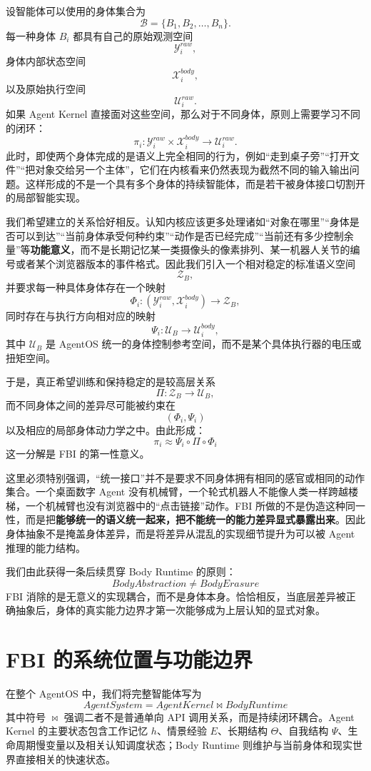 设智能体可以使用的身体集合为
\[
\mathcal B
=
\{B_1,B_2,\ldots,B_n\}.
\]
每一种身体 \(B_i\) 都具有自己的原始观测空间
\[
\mathcal Y_i^{raw},
\]
身体内部状态空间
\[
\mathcal X_i^{body},
\]
以及原始执行空间
\[
\mathcal U_i^{raw}.
\]
如果 Agent Kernel 直接面对这些空间，那么对于不同身体，原则上需要学习不同的闭环：
\[
\pi_i:
\mathcal Y_i^{raw}
\times
\mathcal X_i^{body}
\rightarrow
\mathcal U_i^{raw}.
\]
此时，即使两个身体完成的是语义上完全相同的行为，例如“走到桌子旁”“打开文件”“把对象交给另一个主体”，它们在内核看来仍然表现为截然不同的输入输出问题。这样形成的不是一个具有多个身体的持续智能体，而是若干被身体接口切割开的局部智能实现。

我们希望建立的关系恰好相反。认知内核应该更多处理诸如“对象在哪里”“身体是否可以到达”“当前身体承受何种约束”“动作是否已经完成”“当前还有多少控制余量”等\textbf{功能意义}，而不是长期记忆某一类摄像头的像素排列、某一机器人关节的编号或者某个浏览器版本的事件格式。因此我们引入一个相对稳定的标准语义空间
\[
\mathcal Z_B,
\]
并要求每一种具体身体存在一个映射
\[
\Phi_i:
(\mathcal Y_i^{raw},\mathcal X_i^{body})
\rightarrow
\mathcal Z_B,
\]
同时存在与执行方向相对应的映射
\[
\Psi_i:
\mathcal U_B
\rightarrow
\mathcal U_i^{body},
\]
其中 \(\mathcal U_B\) 是 AgentOS 统一的身体控制参考空间，而不是某个具体执行器的电压或扭矩空间。

于是，真正希望训练和保持稳定的是较高层关系
\[
\Pi:
\mathcal Z_B
\rightarrow
\mathcal U_B,
\]
而不同身体之间的差异尽可能被约束在
\[
(\Phi_i,\Psi_i)
\]
以及相应的局部身体动力学之中。由此形成：
\[
\boxed{
\pi_i
\approx
\Psi_i
\circ
\Pi
\circ
\Phi_i
}
\]
这一分解是 FBI 的第一性意义。

这里必须特别强调，“统一接口”并不是要求不同身体拥有相同的感官或相同的动作集合。一个桌面数字 Agent 没有机械臂，一个轮式机器人不能像人类一样跨越楼梯，一个机械臂也没有浏览器中的“点击链接”动作。FBI 所做的不是伪造这种同一性，而是把\textbf{能够统一的语义统一起来，把不能统一的能力差异显式暴露出来}。因此身体抽象不是掩盖身体差异，而是将差异从混乱的实现细节提升为可以被 Agent 推理的能力结构。

我们由此获得一条后续贯穿 Body Runtime 的原则：
\[
\boxed{
BodyAbstraction
\neq
BodyErasure
}
\]
FBI 消除的是无意义的实现耦合，而不是身体本身。恰恰相反，当底层差异被正确抽象后，身体的真实能力边界才第一次能够成为上层认知的显式对象。


\section{FBI 的系统位置与功能边界}

在整个 AgentOS 中，我们将完整智能体写为
\[
\boxed{
AgentSystem
=
AgentKernel
\bowtie
BodyRuntime
}
\]
其中符号 \(\bowtie\) 强调二者不是普通单向 API 调用关系，而是持续闭环耦合。Agent Kernel 的主要状态包含工作记忆 \(h\)、情景经验 \(E\)、长期结构 \(\Theta\)、自我结构 \(\Psi\)、生命周期慢变量以及相关认知调度状态；Body Runtime 则维护与当前身体和现实世界直接相关的快速状态。

